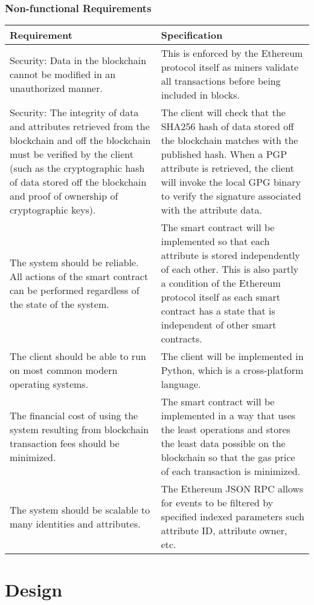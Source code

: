 \documentclass[12pt,a4paper]{report}
\begin{document}
	\subsection{Non-functional Requirements}	
	\begin{longtable}{|p{5.5cm}|p{5.5cm}|}
		\hline
		\textbf{Requirement} & \textbf{Specification} \\ \hline
		Security: Data in the blockchain cannot be modified in an unauthorized manner. & This is enforced by the Ethereum protocol itself as miners validate all transactions before being included in blocks. \\ \hline
		Security: The integrity of data and attributes retrieved from the blockchain and off the blockchain must be verified by the client (such as the cryptographic hash of data stored off the blockchain and proof of ownership of cryptographic keys). & The client will check that the SHA256 hash of data stored off the blockchain matches with the published hash. When a PGP attribute is retrieved, the client will invoke the local GPG binary to verify the signature associated with the attribute data. \\ \hline
		The system should be reliable. All actions of the smart contract can be performed regardless of the state of the system. & The smart contract will be implemented so that each attribute is stored independently of each other. This is also partly a condition of the Ethereum protocol itself as each smart contract has a state that is independent of other smart contracts. \\ \hline
		The client should be able to run on most common modern operating systems. & The client will be implemented in Python, which is a cross-platform language. \\ \hline
		The financial cost of using the system resulting from blockchain transaction fees should be minimized. & The smart contract will be implemented in a way that uses the least operations and stores the least data possible on the blockchain so that the gas price of each transaction is minimized. \\ \hline
		The system should be scalable to many identities and attributes. & The Ethereum JSON RPC allows for events to be filtered by specified indexed parameters such attribute ID, attribute owner, etc. \\ \hline
	\end{longtable}
	
	\chapter{Design}
\end{document}
